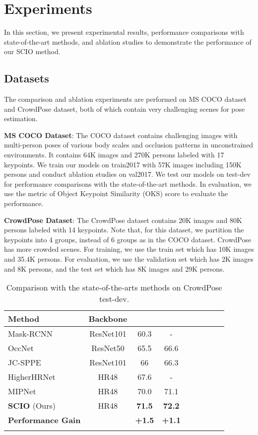 \documentclass[runningheads]{llncs}
\begin{document}
\section{Experiments}
In this section, we present  experimental results, performance comparisons with state-of-the-art methods, and ablation studies to demonstrate the performance of our SCIO method.

\subsection{Datasets}
The comparison and ablation experiments are performed on MS COCO dataset \cite{DBLP:conf/eccv/LinMBHPRDZ14} and CrowdPose \cite{DBLP:conf/cvpr/LiWZMFL19} dataset, both of which contain very challenging scenes for pose estimation.

\textbf{MS COCO Dataset}: The COCO dataset contains challenging images with multi-person poses of various body scales and occlusion patterns in unconstrained environments. It contains 64K images and 270K persons labeled with 17 keypoints. We train our models on train2017 with 57K images including 150K persons and conduct ablation studies on val2017. We test our models on test-dev for performance comparisons with the state-of-the-art methods. In evaluation, we use the metric of Object Keypoint Similarity (OKS) score to evaluate the performance.

\textbf{CrowdPose Dataset}: The CrowdPose dataset contains 20K images and 80K persons labeled with 14 keypoints. Note that, for this dataset, we partition the keypoints into 4 groups, instead of 6 groups as in the COCO dataset. CrowdPose has more crowded scenes.
For training, we use the train set which has 10K images and 35.4K persons. For evaluation, we use the validation set which has 2K images and 8K persons, and the test set which has 8K images and 29K persons. 

\begin{table}[t]
\begin{center}
\caption{
Comparison with the state-of-the-arts methods on CrowdPose test-dev.
}
\label{tab:sota on Crowdpose}
\begin{tabular}{l|cccccccc}
\hline\noalign{\smallskip}
Method & Backbone & \text{}  &   \\
\hline\noalign{\smallskip}
Mask-RCNN \cite{He_2017_ICCV} & ResNet101 & 60.3  & -   \\
OccNet \cite{DBLP:conf/avss/GoldaKSB19} & ResNet50 & 65.5  & 66.6 \\
JC-SPPE \cite{DBLP:conf/cvpr/LiWZMFL19} & ResNet101 & 66  & 66.3    \\
HigherHRNet \cite{Cheng_2020_CVPR} &HR48 & 67.6  & -  \\
MIPNet \cite{Khirodkar_2021_ICCV} &HR48 & 70.0  & 71.1  \\
\hline\noalign{\smallskip}
\textbf{SCIO} (Ours) & HR48  & \textbf{71.5}  & \textbf{72.2} \\
\textbf{Performance Gain} &   & \textbf{+1.5}   & \textbf{+1.1}   \\
\hline\noalign{\smallskip}
\end{tabular}
\end{center}
\end{table}
\end{document}
